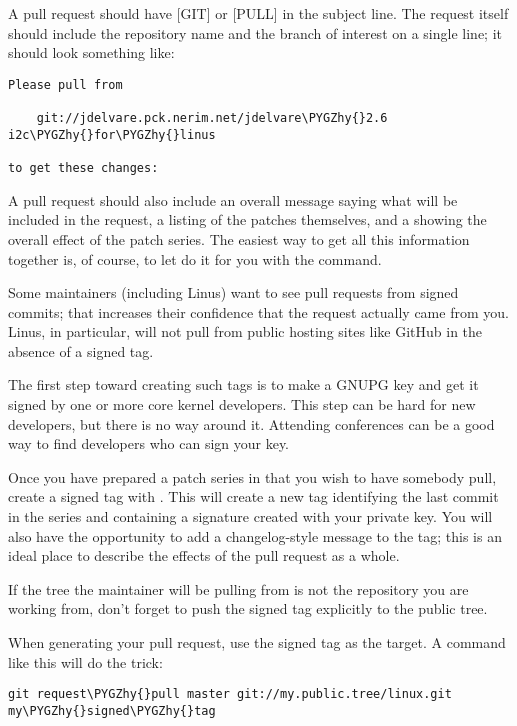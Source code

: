 \documentclass[a4paper,8pt,english]{sphinxmanual}
\def\PYGZhy{\char`\-}
\begin{document}
A pull request should have {[}GIT{]} or {[}PULL{]} in the subject line.  The
request itself should include the repository name and the branch of
interest on a single line; it should look something like:

\begin{Verbatim}[commandchars=\\\{\}]
Please pull from

    git://jdelvare.pck.nerim.net/jdelvare\PYGZhy{}2.6 i2c\PYGZhy{}for\PYGZhy{}linus

to get these changes:
\end{Verbatim}

A pull request should also include an overall message saying what will be
included in the request, a  listing of the patches
themselves, and a  showing the overall effect of the patch series.
The easiest way to get all this information together is, of course, to let
 do it for you with the  command.

Some maintainers (including Linus) want to see pull requests from signed
commits; that increases their confidence that the request actually came
from you.  Linus, in particular, will not pull from public hosting sites
like GitHub in the absence of a signed tag.

The first step toward creating such tags is to make a GNUPG key and get it
signed by one or more core kernel developers.  This step can be hard for
new developers, but there is no way around it.  Attending conferences can
be a good way to find developers who can sign your key.

Once you have prepared a patch series in  that you wish to have somebody
pull, create a signed tag with .  This will create a new tag
identifying the last commit in the series and containing a signature
created with your private key.  You will also have the opportunity to add a
changelog-style message to the tag; this is an ideal place to describe the
effects of the pull request as a whole.

If the tree the maintainer will be pulling from is not the repository you
are working from, don't forget to push the signed tag explicitly to the
public tree.

When generating your pull request, use the signed tag as the target.  A
command like this will do the trick:

\begin{Verbatim}[commandchars=\\\{\}]
git request\PYGZhy{}pull master git://my.public.tree/linux.git my\PYGZhy{}signed\PYGZhy{}tag
\end{Verbatim}
\end{document}

